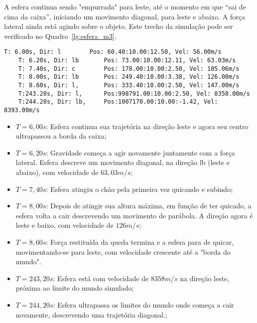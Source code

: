 \documentclass[12pt]{article}
\begin{document}
A esfera continua sendo "empurrada" para leste, até o momento em que “sai de cima da caixa”, iniciando um movimento diagonal, para leste e abaixo. A força lateral ainda está agindo sobre o objeto. Este trecho da simulação pode ser verificado no Quadro~\ref{lg:esfera_m3}.

\begin{lstlisting}[frame=single,caption=Registro Acessível: Esfera se movendo diagonalmente\label{lg:esfera_m3}]
	T: 6.00s, Dir: l		Pos: 60.40:10.00:12.50, Vel: 56.00m/s
	T: 6.20s, Dir: lb		Pos: 73.00:10.00:12.11, Vel: 63.03m/s
	T: 7.40s, Dir: c		Pos: 178.00:10.00:2.50, Vel: 105.06m/s
	T: 8.00s, Dir: lb		Pos: 249.40:10.00:3.38, Vel: 126.00m/s
	T: 8.60s, Dir: l,		Pos: 333.40:10.00:2.50, Vel: 147.00m/s
	T:243.20s, Dir: l,  	Pos:998791.00:10.00:2.50, Vel: 8358.00m/s
	T:244.20s, Dir: lb, 	Pos:1007170.00:10.00:-1.42, Vel: 8393.00m/s
\end{lstlisting}

\begin{itemize}
	\item $T=6,00s$: Esfera continua sua trajetória na direção leste e agora seu centro ultrapassou a borda da caixa;
	
	\item $T=6,20s$: Gravidade começa a agir novamente juntamente com a força lateral. Esfera descreve um movimento diagonal, na direção lb (leste e abaixo), com velocidade de $63,03m/s$;
	
	\item $T=7,40s$: Esfera atingiu o chão pela primeira vez quicando e subindo;
	
	\item $T=8,00s$: Depois de atingir sua altura máxima, em função de ter quicado, a esfera volta a cair descrevendo um movimento de parábola. A direção agora é leste e baixo, com velocidade de $126m/s$;
	
	\item $T=8,60s$: Força restituída da queda termina e a esfera para de quicar, movimentando-se para leste, com velocidade crescente até a "borda do mundo".
	\item $T=243,20s$: Esfera está com velocidade de $8358m/s$ na direção leste, próxima ao limite do mundo simulado;
	\item $T=244,20s$: Esfera ultrapassa os limites do mundo onde começa a cair novamente, descrevendo uma trajetória diagonal.;
\end{itemize}
\end{document}

